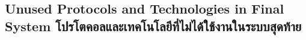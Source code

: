 \subsection{\ifenglish Unused Protocols and Technologies in Final System \else โปรโตคอลและเทคโนโลยีที่ไม่ได้ใช้งานในระบบสุดท้าย \fi}